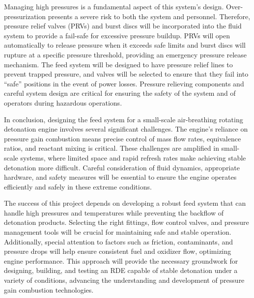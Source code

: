 Managing high pressures is a fundamental aspect of this system's design. Over-pressurization presents a severe risk to both the system and personnel. Therefore, pressure relief valves (PRVs) and burst discs will be incorporated into the fluid system to provide a fail-safe for excessive pressure buildup. PRVs will open automatically to release pressure when it exceeds safe limits and burst discs will rupture at a specific pressure threshold, providing an emergency pressure release mechanism. The feed system will be designed to have pressure relief lines to prevent trapped pressure, and valves will be selected to ensure that they fail into “safe” positions in the event of power losses. Pressure relieving components and careful system design are critical for ensuring the safety of the system and of operators during hazardous operations. 

In conclusion, designing the feed system for a small-scale air-breathing rotating detonation engine involves several significant challenges. The engine’s reliance on pressure gain combustion means precise control of mass flow rates, equivalence ratios, and reactant mixing is critical. These challenges are amplified in small-scale systems, where limited space and rapid refresh rates make achieving stable detonation more difficult. Careful consideration of fluid dynamics, appropriate hardware, and safety measures will be essential to ensure the engine operates efficiently and safely in these extreme conditions.

The success of this project depends on developing a robust feed system that can handle high pressures and temperatures while preventing the backflow of detonation products. Selecting the right fittings, flow control valves, and pressure management tools will be crucial for maintaining safe and stable operation. Additionally, special attention to factors such as friction, contaminants, and pressure drops will help ensure consistent fuel and oxidizer flow, optimizing engine performance. This approach will provide the necessary groundwork for designing, building, and testing an RDE capable of stable detonation under a variety of conditions, advancing the understanding and development of pressure gain combustion technologies.